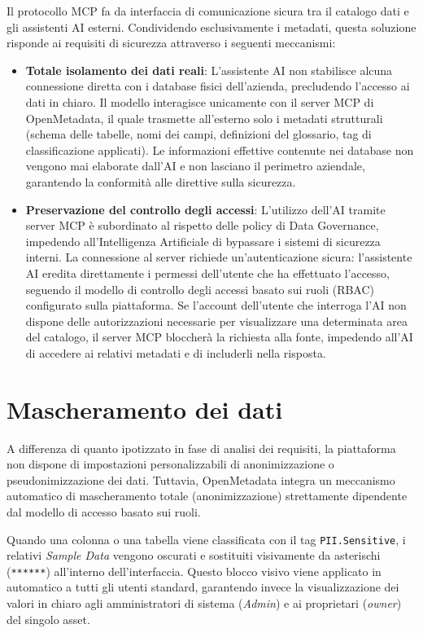 Il protocollo MCP fa da interfaccia di comunicazione sicura tra il catalogo dati e gli assistenti AI esterni. Condividendo esclusivamente i metadati, 
questa soluzione risponde ai requisiti di sicurezza attraverso i seguenti meccanismi:

\begin{itemize}
    \item \textbf{Totale isolamento dei dati reali}: L'assistente AI non stabilisce alcuna connessione diretta con i database fisici dell'azienda, precludendo 
    l'accesso ai dati in chiaro. Il modello interagisce unicamente con il server MCP di OpenMetadata, il quale trasmette all'esterno solo i metadati 
    strutturali (schema delle tabelle, nomi dei campi, definizioni del glossario, tag di classificazione applicati). Le informazioni effettive contenute nei 
    database non vengono mai elaborate dall'AI e non lasciano il perimetro aziendale, garantendo la conformità alle direttive sulla sicurezza.
    \item \textbf{Preservazione del controllo degli accessi}: L'utilizzo dell'AI tramite server MCP è subordinato al rispetto delle policy di Data Governance, impedendo 
    all'Intelligenza Artificiale di bypassare i sistemi di sicurezza interni. La connessione al server richiede un'autenticazione sicura: l'assistente AI eredita 
    direttamente i permessi dell'utente che ha effettuato l'accesso, seguendo il modello di controllo degli accessi basato sui ruoli (RBAC) configurato sulla piattaforma. 
    Se l'account dell'utente che interroga l'AI non dispone delle autorizzazioni necessarie per visualizzare una determinata area del catalogo, il server MCP bloccherà 
    la richiesta alla fonte, impedendo all'AI di accedere ai relativi metadati e di includerli nella risposta.
\end{itemize}


\section{Mascheramento dei dati}
A differenza di quanto ipotizzato in fase di analisi dei requisiti, la piattaforma non dispone di impostazioni personalizzabili di anonimizzazione o pseudonimizzazione dei dati. 
Tuttavia, OpenMetadata integra un meccanismo automatico di mascheramento totale (anonimizzazione) strettamente dipendente dal modello di accesso basato sui ruoli.

Quando una colonna o una tabella viene classificata con il tag \texttt{PII.Sensitive}, i relativi \emph{Sample Data} vengono oscurati e sostituiti visivamente da asterischi 
(\texttt{******}) all'interno dell'interfaccia. Questo blocco visivo viene applicato in automatico a tutti gli utenti standard, garantendo invece la visualizzazione dei valori 
in chiaro agli amministratori di sistema (\emph{Admin}) e ai proprietari (\emph{owner}) del singolo asset.

